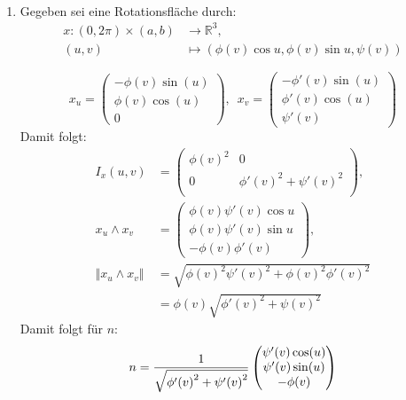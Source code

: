 \begin{solution}
 \
 \begin{enumerate}[label=(\alph*)] 
   \item   Gegeben sei eine Rotationsfläche durch:
  \begin{align*}
    x:(0,2\pi) \times (a,b) &\to \mathbb{R}^3, \\
    (u,v) &\mapsto (\phi(v)\cos u, \phi(v)\sin u, \psi(v))
  \end{align*}

  \begin{equation*}
    x_u = \begin{pmatrix}
      -\phi(v)\sin(u) \\ \phi(v)\cos(u) \\ 0  
    \end{pmatrix}, \enspace
    x_v = \begin{pmatrix}
      -\phi'(v)\sin(u) \\ \phi'(v)\cos(u) \\ \psi'(v) 
    \end{pmatrix} 
  \end{equation*}
  Damit folgt: 
  \begin{align*}
    I_x(u,v) &= 
    \begin{pmatrix}
      {\phi(v)}^2 & 0 \\
      0 & {\phi'(v)}^2 + {\psi'(v)}^2 \\
    \end{pmatrix}, \\
    x_u \land x_v &= 
    \begin{pmatrix}
      \phi(v) \psi'(v) \cos u \\
      \phi(v) \psi'(v) \sin u \\
      -\phi(v) \phi'(v)
    \end{pmatrix}, \\
    \Vert x_u \land x_v \Vert &= \sqrt{ {\phi(v)}^2 {\psi'(v)}^2 + {\phi(v)}^2 {\phi'(v)}^2} \\
    &= \phi(v) \sqrt{ {\phi'(v)}^2 + {\psi(v)}^2}
  \end{align*}
  Damit folgt für \( n \):
  \begin{equation*}
    \centering
    n = \frac{1}{\sqrt{ {\phi'(v)}^2 + {\psi'(v)}^2}} \begin{pmatrix}
      \psi'(v) \cos(u) \\
      \psi'(v) \sin(u) \\
      -\phi(v)
    \end{pmatrix}
  \end{equation*}

\end{enumerate}
\end{solution}
